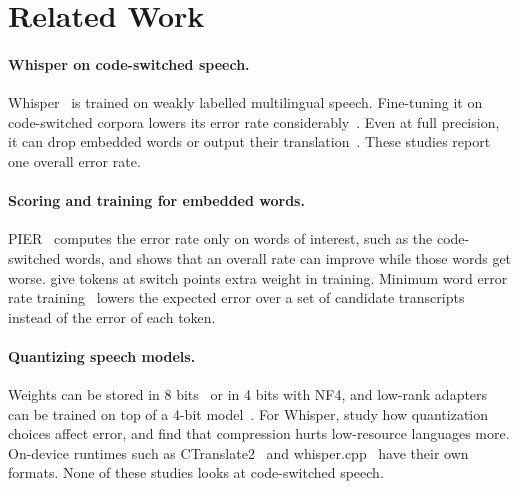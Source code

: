 \section{Related Work}
\label{sec:related}

\paragraph{Whisper on code-switched speech.}
Whisper~\citep{radford2023whisper} is trained on weakly labelled multilingual speech. Fine-tuning it on code-switched corpora lowers its error rate considerably~\citep{yang2024adapting,zhou2025csdialogue}. Even at full precision, it can drop embedded words or output their translation~\citep{peng2023prompting}. These studies report one overall error rate.

\paragraph{Scoring and training for embedded words.}
PIER~\citep{ugan2025pier} computes the error rate only on words of interest, such as the code-switched words, and shows that an overall rate can improve while those words get worse. \citet{ugan2025adapting} give tokens at switch points extra weight in training. Minimum word error rate training~\citep{prabhavalkar2018mwer} lowers the expected error over a set of candidate transcripts instead of the error of each token.

\paragraph{Quantizing speech models.}
Weights can be stored in 8 bits~\citep{dettmers2022llmint8} or in 4 bits with NF4, and low-rank adapters~\citep{hu2022lora} can be trained on top of a 4-bit model~\citep{dettmers2023qlora}. For Whisper, \citet{sohler2026quantizing} study how quantization choices affect error, and \citet{ferraz2024efficient} find that compression hurts low-resource languages more. On-device runtimes such as CTranslate2~\citep{ctranslate2} and whisper.cpp~\citep{whispercpp} have their own formats. None of these studies looks at code-switched speech.

